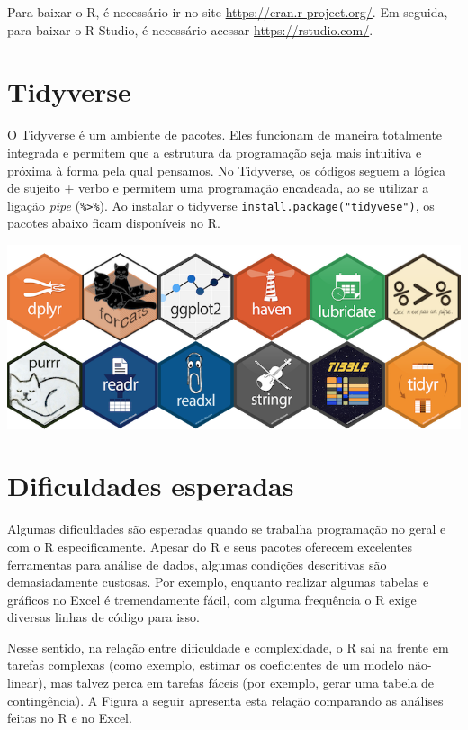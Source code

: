\documentclass[
]{book}
\begin{document}
Para baixar o R, é necessário ir no site \url{https://cran.r-project.org/}. Em seguida, para baixar o R Studio, é necessário acessar \url{https://rstudio.com/}.

\hypertarget{tidyverse}{%
\section{Tidyverse}\label{tidyverse}}

O Tidyverse é um ambiente de pacotes. Eles funcionam de maneira totalmente integrada e permitem que a estrutura da programação seja mais intuitiva e próxima à forma pela qual pensamos. No Tidyverse, os códigos seguem a lógica de sujeito + verbo e permitem uma programação encadeada, ao se utilizar a ligação \emph{pipe} (\texttt{\%\textgreater{}\%}). Ao instalar o tidyverse \texttt{install.package("tidyvese")}, os pacotes abaixo ficam disponíveis no R.

\includegraphics{./img/tidyverse_website.PNG}

\hypertarget{dificuldades-esperadas}{%
\section{Dificuldades esperadas}\label{dificuldades-esperadas}}

Algumas dificuldades são esperadas quando se trabalha programação no geral e com o R especificamente. Apesar do R e seus pacotes oferecem excelentes ferramentas para análise de dados, algumas condições descritivas são demasiadamente custosas. Por exemplo, enquanto realizar algumas tabelas e gráficos no Excel é tremendamente fácil, com alguma frequência o R exige diversas linhas de código para isso.

Nesse sentido, na relação entre dificuldade e complexidade, o R sai na frente em tarefas complexas (como exemplo, estimar os coeficientes de um modelo não-linear), mas talvez perca em tarefas fáceis (por exemplo, gerar uma tabela de contingência). A Figura a seguir apresenta esta relação comparando as análises feitas no R e no Excel.
\end{document}
